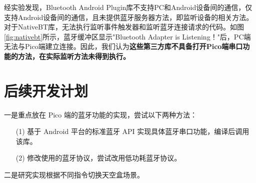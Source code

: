 \documentclass[a4paper,10pt]{article}
\begin{document}
		经实验发现，Bluetooth Android Plugin库不支持PC和Android设备间的通信，仅支持Android设备间的通信，且未提供蓝牙服务器方法，即监听设备的相关方法。对于NativeBT库，无法执行监听事件触发器和监听蓝牙连接请求的代码。如图\ref{fig:nativebt}所示，蓝牙缓冲区显示"Bluetooth Adapter is Listening！"后，PC端无法与Pico端建立连接。因此，我们认为\textbf{这些第三方库不具备打开Pico端串口功能的方法，在实际监听方法未得到执行。}
		
		\section{后续开发计划}
		
		一是重点放在 Pico 端的蓝牙功能的实现，尝试以下两种方法：
		
		\begin{itemize}
			\item[(1)] 基于 Android 平台的标准蓝牙 API 实现具体蓝牙串口功能，编译后调用该库。
			\item[(2)] 修改使用的蓝牙协议，尝试改用低功耗蓝牙协议。
		\end{itemize}
		
		二是研究实现根据不同指令切换天空盒场景。
		
		
		
		
			
			
			
			
			
			
		
%		
%		
		
		
	
\end{document}
